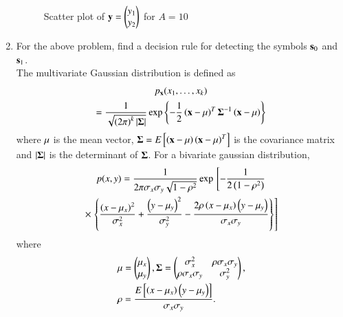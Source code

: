 \begin{enumerate}[label=\thesection.\arabic*.,ref=\thesection.\theenumi]
\begin{figure}
\caption{Scatter plot of $\mathbf{y} = \begin{pmatrix} y_1 \\ y_2 \end{pmatrix}$ for $A = 10$}
\label{fig:scatter_plt_y}
\end{figure}
%
\item
For the above problem, find a decision rule for detecting the symbols $\mathbf{s}_0 $ and $\mathbf{s}_1$.
\\
\solution The multivariate Gaussian distribution is defined as
%
\begin{multline}
\label{eq:multivariate}
p_{\mathbf{x}}(x_1,\dots,x_k)
\\
=\frac{1}{\sqrt{\left(2\pi\right)^k\left\vert\mathbf{\Sigma}\right\vert}}\exp\left\{-\frac{1}{2}\left(\mathbf{x}-\mathbf{\mu}\right)^T\mathbf{\Sigma}^{-1}\left(\mathbf{x}-\mathbf{\mu}\right)\right\}
\end{multline}
%
where $\mathbf{\mu}$ is the mean vector, $\mathbf{\Sigma} = E{}\left[\left(\mathbf{x}-\mathbf{\mu}\right)\left(\mathbf{x}-\mathbf{\mu}\right)^T\right]$ is the covariance matrix and $\left\vert\mathbf{\Sigma}\right\vert$ is the determinant of $\mathbf{\Sigma}$.
For a bivariate gaussian distribution,
{\small
\begin{multline}
\label{eq:bivariate}
p(x,y)= \frac{1}{2\pi \sigma_x\sigma_y\sqrt{1-\rho^2}}\exp{}\left[-\frac{1}{2\left(1-\rho^2\right)}\right.
\\
\times {}\left.\left\{\frac{\left(x-\mu_x\right)^2}{\sigma_x^2}+\frac{\left(y-\mu_y\right)^2}{\sigma_y^2}-\frac{2\rho\left(x-\mu_x\right)\left(y-\mu_y\right)}{\sigma_x\sigma_y}\right\}\right]
\end{multline}
}
%
where
%
\begin{align}
&\mbf{\mu}=
\begin{pmatrix*}
\mu_x \\
\mu_y
\end{pmatrix*},
\mbf{\Sigma} = 
\begin{pmatrix*}%
\sigma_x^2 & \rho\sigma_x\sigma_y \\
\rho\sigma_x\sigma_y & \sigma_y^2
\end{pmatrix*},\\
&\rho = \frac{E\sbrak{\brak{x - \mu_x}\brak{y-\mu_y}}}{\sigma_x\sigma_y}.
\end{align}

\end{enumerate}
